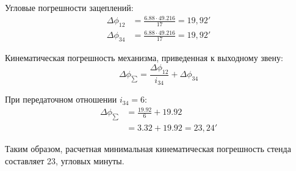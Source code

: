 Угловые погрешности зацеплений:
\begin{align*}
\Delta \phi_{12} &= \frac{6.88 \cdot 49.216}{17} = 19,\!92' \\
\Delta \phi_{34} &= \frac{6.88 \cdot 49.216}{17} = 19,\!92'
\end{align*}

Кинематическая погрешность механизма, приведенная к выходному звену:
\begin{equation}
\Delta \phi_{\sum} = \frac{\Delta \phi_{12}}{i_{34}} + \Delta \phi_{34}
\end{equation}

\noindent При передаточном отношении $i_{34} = 6$:
\begin{align*}
\Delta \phi_{\sum} &= \frac{19.92}{6} + 19.92 \\
&= 3.32 + 19.92 = 23,\!24'
\end{align*}

Таким образом, расчетная минимальная кинематическая погрешность стенда составляет 23, угловых минуты.





